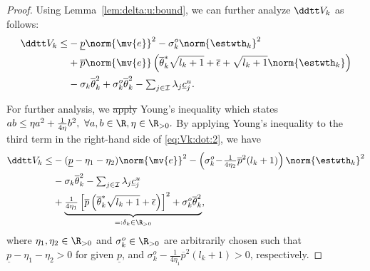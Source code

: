 \documentclass[letterpaper, journal]{IEEEtran}
\providecommand{\DIFadd}[1]{{\protect\color{blue}\uwave{#1}}} %
\providecommand{\DIFdel}[1]{{\protect\color{red}\sout{#1}}} %
\providecommand{\DIFaddbegin}{} %
\providecommand{\DIFaddend}{} %
\providecommand{\DIFdelbegin}{} %
\providecommand{\DIFdelend}{} %
\begin{document}
\begin{proof}
Using Lemma~\ref{lem:delta:u:bound}, we can further analyze $\ddtt V_{k}$ as follows:
\begin{align} \label{eq:Vk:dot:2} 
  \ddtt V_{k}
  \le&
    -\underline{p}
    \norm{\mv{e}}^2
    -
    \sigma_k^o
    \norm{\estwth_k}^2
  \\ \nonumber
  &
    +
    \overline{p}
    \norm{\mv{e}}
    \left(
      \overline{\theta}^*_k
      \sqrt{l_{k}+1}
      +
      \overline{\epsilon}
      +
      \sqrt{l_k+1}\norm{\estwth_k}
    \right)        
  \\ \nonumber
  &
    -
    \sigma_k 
    \overline{\theta}_k^2
    +
    \sigma_k^o 
    \overline{\theta}_k^2
    -
    \textstyle\sum_{j\in\mathcal{I}}
    \lambda_j
    \underline{c}_j^u
    .
\end{align}

For further analysis, we \DIFdelbegin \DIFdel{apply }\DIFdelend \DIFaddbegin \DIFadd{use }\DIFaddend Young's inequality which states 
$
  ab
  \le
  \eta a^2
  +
  \frac{1}{4\eta}b^2,
  \ 
  \forall a,b\in\R, \eta\in\R_{>0}
  .
$
By applying Young's inequality to the third term in the right-hand side of \eqref{eq:Vk:dot:2}, we have
\begin{align} \label{eq:Vk:dot:3} \nonumber
  \ddtt V_{k}
  \le &
    -(\underline{p}-\eta_1-\eta_2)
    \norm{\mv{e}}^2
    -
    \left(
      \sigma_k^o
      \!-\!
      \tfrac{1}{4\eta_2}
      \overline{p}^2
      (l_k+1)
    \right)
    \norm{\estwth_k}^2
  \\ 
  &
    -
    \sigma_k \overline{\theta}_k^2
    -
    \textstyle\sum_{j\in\mathcal{I}}
    \lambda_j
    \underline{c}_j^u
  \\ \nonumber
  &
      +
  \underbrace{
    \tfrac{1}{4\eta_1}
    \left[
    \overline{p}
      \left(
        \overline{\theta}_k^*
        \sqrt{l_{k}+1}
        +
        \overline{\epsilon}
      \right)
    \right]^2
    +
    \sigma_k^o
    \overline{\theta}_k^2
  }_{=: \delta_k \in \R_{>0}}
  ,
\end{align}
where $\eta_1,\eta_2\in\R_{>0}$ and $\sigma_k^o\in\R_{>0}$ are arbitrarily chosen such that $\underline{p}-\eta_1-\eta_2>0$ for given $\underline{p}$, and $\sigma_k^o - \frac{1}{4\eta_1} \overline{p}^2 (l_k+1) > 0$, respectively.


\end{proof}
\end{document}
